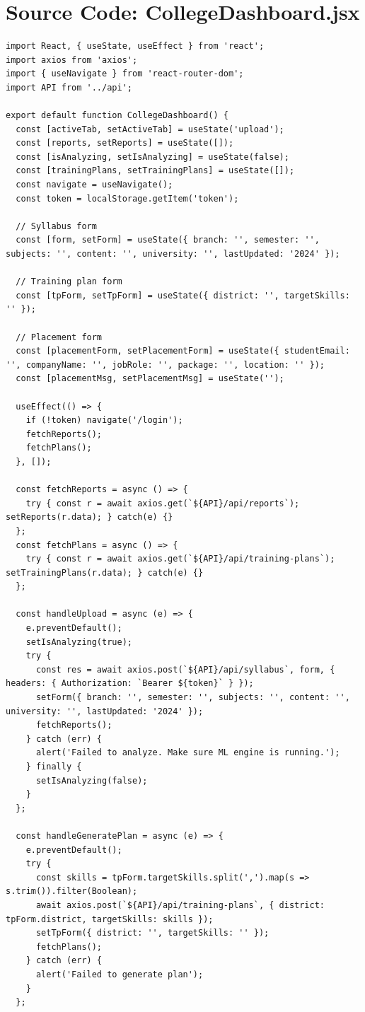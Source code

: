 \documentclass[12pt,a4paper]{report}
\begin{document}
\section*{Source Code: CollegeDashboard.jsx}
\begin{verbatim}
import React, { useState, useEffect } from 'react';
import axios from 'axios';
import { useNavigate } from 'react-router-dom';
import API from '../api';

export default function CollegeDashboard() {
  const [activeTab, setActiveTab] = useState('upload');
  const [reports, setReports] = useState([]);
  const [isAnalyzing, setIsAnalyzing] = useState(false);
  const [trainingPlans, setTrainingPlans] = useState([]);
  const navigate = useNavigate();
  const token = localStorage.getItem('token');

  // Syllabus form
  const [form, setForm] = useState({ branch: '', semester: '', subjects: '', content: '', university: '', lastUpdated: '2024' });

  // Training plan form
  const [tpForm, setTpForm] = useState({ district: '', targetSkills: '' });

  // Placement form
  const [placementForm, setPlacementForm] = useState({ studentEmail: '', companyName: '', jobRole: '', package: '', location: '' });
  const [placementMsg, setPlacementMsg] = useState('');

  useEffect(() => {
    if (!token) navigate('/login');
    fetchReports();
    fetchPlans();
  }, []);

  const fetchReports = async () => {
    try { const r = await axios.get(`${API}/api/reports`); setReports(r.data); } catch(e) {}
  };
  const fetchPlans = async () => {
    try { const r = await axios.get(`${API}/api/training-plans`); setTrainingPlans(r.data); } catch(e) {}
  };

  const handleUpload = async (e) => {
    e.preventDefault();
    setIsAnalyzing(true);
    try {
      const res = await axios.post(`${API}/api/syllabus`, form, { headers: { Authorization: `Bearer ${token}` } });
      setForm({ branch: '', semester: '', subjects: '', content: '', university: '', lastUpdated: '2024' });
      fetchReports();
    } catch (err) {
      alert('Failed to analyze. Make sure ML engine is running.');
    } finally {
      setIsAnalyzing(false);
    }
  };

  const handleGeneratePlan = async (e) => {
    e.preventDefault();
    try {
      const skills = tpForm.targetSkills.split(',').map(s => s.trim()).filter(Boolean);
      await axios.post(`${API}/api/training-plans`, { district: tpForm.district, targetSkills: skills });
      setTpForm({ district: '', targetSkills: '' });
      fetchPlans();
    } catch (err) {
      alert('Failed to generate plan');
    }
  };


\end{verbatim}
\end{document}
